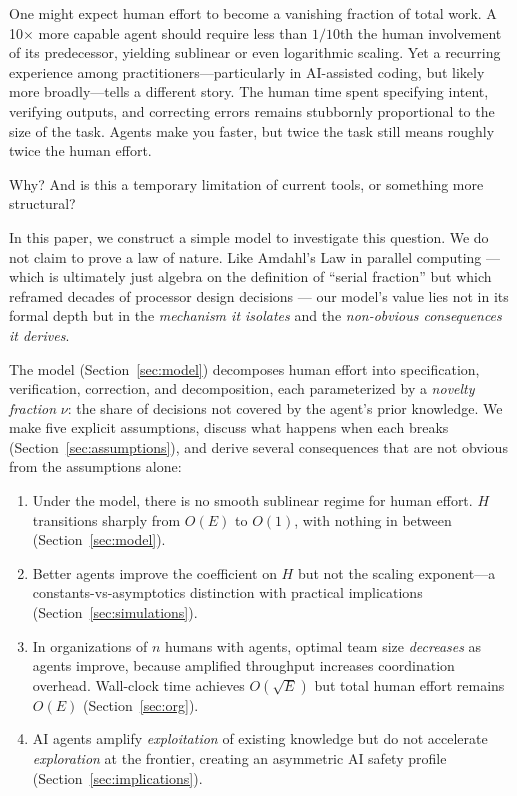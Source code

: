 \documentclass[11pt,a4paper]{article}
\begin{document}
One might expect human effort to become a vanishing fraction of total work. A 10$\times$ more capable agent should require less than $1/10$th the human involvement of its predecessor, yielding sublinear or even logarithmic scaling. Yet a recurring experience among practitioners---particularly in AI-assisted coding, but likely more broadly---tells a different story. The human time spent specifying intent, verifying outputs, and correcting errors remains stubbornly proportional to the size of the task. Agents make you faster, but twice the task still means roughly twice the human effort.

Why? And is this a temporary limitation of current tools, or something more structural?

In this paper, we construct a simple model to investigate this question. We do not claim to prove a law of nature. Like Amdahl's Law in parallel computing \citep{amdahl1967} --- which is ultimately just algebra on the definition of ``serial fraction'' but which reframed decades of processor design decisions --- our model's value lies not in its formal depth but in the \emph{mechanism it isolates} and the \emph{non-obvious consequences it derives}.

The model (Section~\ref{sec:model}) decomposes human effort into specification, verification, correction, and decomposition, each parameterized by a \emph{novelty fraction} $\nu$: the share of decisions not covered by the agent's prior knowledge. We make five explicit assumptions, discuss what happens when each breaks (Section~\ref{sec:assumptions}), and derive several consequences that are not obvious from the assumptions alone:

\begin{enumerate}
\item Under the model, there is no smooth sublinear regime for human effort. $H$ transitions sharply from $O(E)$ to $O(1)$, with nothing in between (Section~\ref{sec:model}).
\item Better agents improve the coefficient on $H$ but not the scaling exponent---a constants-vs-asymptotics distinction with practical implications (Section~\ref{sec:simulations}).
\item In organizations of $n$ humans with agents, optimal team size \emph{decreases} as agents improve, because amplified throughput increases coordination overhead. Wall-clock time achieves $O(\sqrt{E})$ but total human effort remains $O(E)$ (Section~\ref{sec:org}).
\item AI agents amplify \emph{exploitation} of existing knowledge but do not accelerate \emph{exploration} at the frontier, creating an asymmetric AI safety profile (Section~\ref{sec:implications}).
\end{enumerate}
\end{document}
